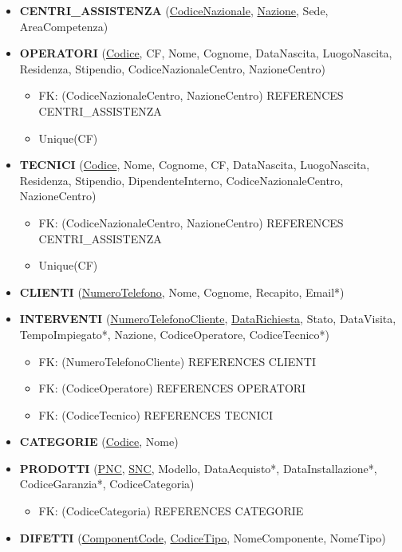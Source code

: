 \documentclass[a4paper, 12pt]{report}
\begin{document}
\begin{itemize}
	\item \textbf{CENTRI\_ASSISTENZA} (\underline{CodiceNazionale}, \underline{Nazione}, Sede, AreaCompetenza)
	\item \textbf{OPERATORI} (\underline{Codice}, CF, Nome, Cognome, DataNascita, LuogoNascita, Residenza, Stipendio, CodiceNazionaleCentro, NazioneCentro)
		\begin{itemize}[leftmargin=*, topsep=0pt]
			\item[] FK: (CodiceNazionaleCentro, NazioneCentro) REFERENCES CENTRI\_ASSISTENZA
			\item[] Unique(CF)
		\end{itemize}
	\item \textbf{TECNICI} (\underline{Codice}, Nome, Cognome, CF,  DataNascita, LuogoNascita, Residenza, Stipendio, DipendenteInterno, CodiceNazionaleCentro, NazioneCentro)
		\begin{itemize}[leftmargin=*, topsep=0pt]
			\item[] FK: (CodiceNazionaleCentro, NazioneCentro) REFERENCES CENTRI\_ASSISTENZA
			\item[] Unique(CF)
		\end{itemize}
	\item \textbf{CLIENTI} (\underline{NumeroTelefono}, Nome, Cognome, Recapito, Email*)
	\item \textbf{INTERVENTI} (\underline{NumeroTelefonoCliente}, \underline{DataRichiesta}, Stato, DataVisita, TempoImpiegato*, Nazione, CodiceOperatore, CodiceTecnico*)
		\begin{itemize}[leftmargin=*, topsep=0pt]
			\item[] FK: (NumeroTelefonoCliente) REFERENCES CLIENTI
			\item[] FK: (CodiceOperatore) REFERENCES OPERATORI
			\item[] FK: (CodiceTecnico) REFERENCES TECNICI
		\end{itemize}		
	\item \textbf{CATEGORIE} (\underline{Codice}, Nome)
	\item \textbf{PRODOTTI} (\underline{PNC}, \underline{SNC}, Modello, DataAcquisto*, DataInstallazione*, CodiceGaranzia*, CodiceCategoria)
		\begin{itemize}[leftmargin=*, topsep=0pt]
			\item[] FK: (CodiceCategoria) REFERENCES CATEGORIE
		\end{itemize}		
	\item \textbf{DIFETTI} (\underline{ComponentCode}, \underline{CodiceTipo}, NomeComponente, NomeTipo)

\end{itemize}
\end{document}
